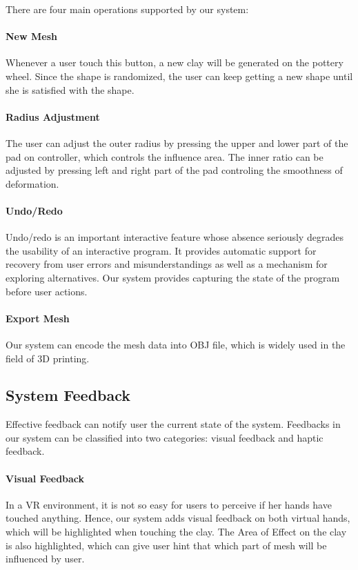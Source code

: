 \documentclass{svjour3}                     %
\begin{document}

There are four main operations supported by our system:

\paragraph{New Mesh}
Whenever a user touch this button, a new clay will be generated on the pottery wheel. Since the shape is randomized, the user can keep getting a new shape until she is satisfied with the shape.

\paragraph{Radius Adjustment}
The user can adjust the outer radius by pressing the upper and lower part of the pad on controller, which controls the influence area. The inner ratio can be adjusted by pressing left and right part of the pad controling the smoothness of deformation.


\paragraph{Undo/Redo}
Undo/redo is an important interactive feature whose absence seriously degrades the usability of an interactive program.\cite{choudhary1995general} It provides automatic support for recovery from user errors and misunderstandings as well as a mechanism for exploring alternatives. Our system provides capturing the state of the program before user actions.

\paragraph{Export Mesh}
Our system can encode the mesh data into OBJ file, which is widely used in the field of 3D printing.

\subsection{System Feedback}
\label{sec:4.4}
Effective feedback can notify user the current state of the system. Feedbacks in our system can be classified into two categories: visual feedback and haptic feedback.
\paragraph{Visual Feedback}
In a VR environment, it is not so easy for users to perceive if her hands have touched anything. Hence, our system adds visual feedback on both virtual hands, which will be highlighted when touching the clay. The Area of Effect on the clay is also highlighted, which can give user hint that which part of mesh will be influenced by user.
\end{document}
